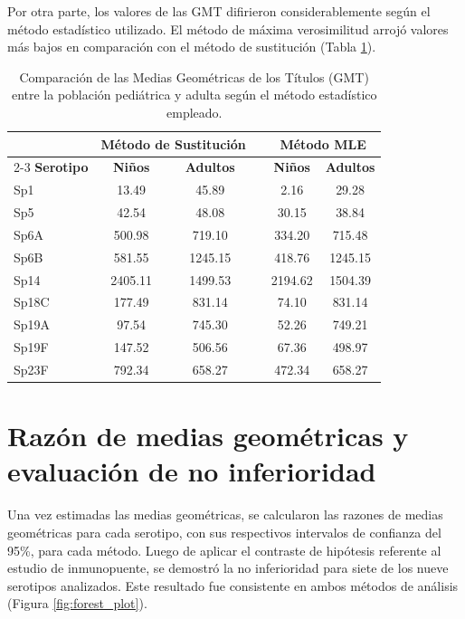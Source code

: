 Por otra parte, los valores de las GMT difirieron considerablemente según el método estadístico utilizado. El método de máxima verosimilitud arrojó valores más bajos en comparación con el método de sustitución (Tabla \ref{tab:gmt_valores}).

\begin{table}[htbp]
	\centering
	\caption{Comparación de las Medias Geométricas de los Títulos (GMT) entre la población pediátrica y adulta según el método estadístico empleado.}
	\label{tab:gmt_valores}
	\begin{tabular}{lccccc}
		\toprule
		& \multicolumn{2}{c}{\textbf{Método de Sustitución}} & & \multicolumn{2}{c}{\textbf{Método MLE}} \\
		\cmidrule{2-3} \cmidrule{5-6}
		\textbf{Serotipo} & \textbf{Niños} & \textbf{Adultos} & & \textbf{Niños} & \textbf{Adultos} \\
		\midrule
		Sp1   & 13.49   & 45.89   & & 2.16   & 29.28   \\
		Sp5   & 42.54   & 48.08   & & 30.15  & 38.84   \\
		Sp6A  & 500.98  & 719.10  & & 334.20 & 715.48  \\
		Sp6B  & 581.55  & 1245.15 & & 418.76 & 1245.15 \\
		Sp14  & 2405.11 & 1499.53 & & 2194.62& 1504.39 \\
		Sp18C & 177.49  & 831.14  & & 74.10  & 831.14  \\
		Sp19A & 97.54   & 745.30  & & 52.26  & 749.21  \\
		Sp19F & 147.52  & 506.56  & & 67.36  & 498.97  \\
		Sp23F & 792.34  & 658.27  & & 472.34 & 658.27  \\
		\bottomrule
	\end{tabular}
\end{table}
\FloatBarrier

\section{Razón de medias geométricas y evaluación de no inferioridad}

Una vez estimadas las medias geométricas, se calcularon las razones de medias geométricas para cada serotipo, con sus respectivos intervalos de confianza del 95\%, para cada método. Luego de aplicar el contraste de hipótesis referente al estudio de inmunopuente, se demostró la no inferioridad para siete de los nueve serotipos analizados. Este resultado fue consistente en ambos métodos de análisis (Figura \ref{fig:forest_plot}).

